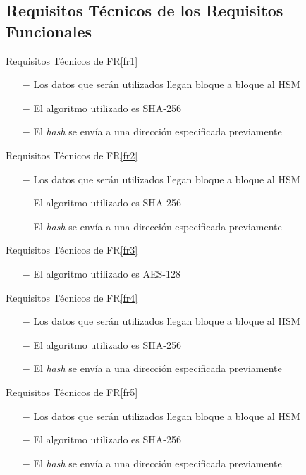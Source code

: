 \documentclass[a4paper]{article}
\begin{document}
  \subsection{Requisitos Técnicos de los Requisitos Funcionales}
  
    \begin{technical}
      \techrequirement
            {Requisitos Técnicos de FR\ref{fr1}}
            {
      \begin{itemize}
        \item[$-$]{Los datos que serán utilizados llegan bloque a bloque al HSM}
        \item[$-$]{El algoritmo utilizado es SHA-256}
                \item[$-$]{El \textit{hash} se envía a una dirección especificada previamente}
      \end{itemize}
      }
            
      \techrequirement
            {Requisitos Técnicos de FR\ref{fr2}}
      {
      \begin{itemize}
        \item[$-$]{Los datos que serán utilizados llegan bloque a bloque al HSM}
        \item[$-$]{El algoritmo utilizado es SHA-256}
                \item[$-$]{El \textit{hash} se envía a una dirección especificada previamente}
      \end{itemize}
      }
            
      \techrequirement
      {Requisitos Técnicos de FR\ref{fr3}}
      {
      \begin{itemize}
        \item[$-$]{El algoritmo utilizado es AES-128}
      \end{itemize}
      }
            
      \techrequirement
      {Requisitos Técnicos de FR\ref{fr4}}
      {
      \begin{itemize}
        \item[$-$]{Los datos que serán utilizados llegan bloque a bloque al HSM}
        \item[$-$]{El algoritmo utilizado es SHA-256}
                \item[$-$]{El \textit{hash} se envía a una dirección especificada previamente}
      \end{itemize}
      }
            
      \techrequirement
      {Requisitos Técnicos de FR\ref{fr5}}
      {
      \begin{itemize}
        \item[$-$]{Los datos que serán utilizados llegan bloque a bloque al HSM}
        \item[$-$]{El algoritmo utilizado es SHA-256}
                \item[$-$]{El \textit{hash} se envía a una dirección especificada previamente}
      \end{itemize}
      }
            

\end{technical}
\end{document}
